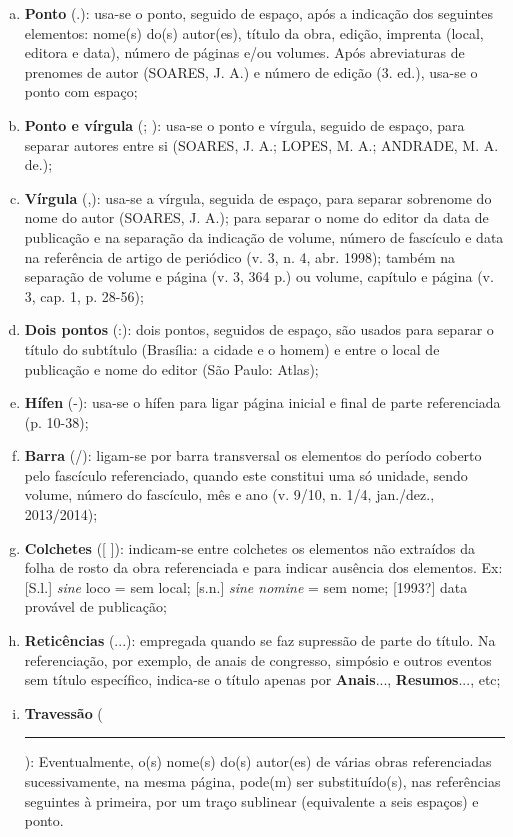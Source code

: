 \begin{enumerate}[a)]
  \item	 \textbf{Ponto} (.): usa-se o ponto, seguido de espaço, após a indicação dos seguintes elementos: nome(s) do(s) autor(es), título da obra, edição, imprenta (local, editora e data), número de páginas e/ou  volumes. Após abreviaturas de prenomes de autor (SOARES, J. A.) e número de edição (3. ed.), usa-se o ponto com espaço;
  \item	 \textbf{Ponto e vírgula} (; ): usa-se o ponto e vírgula, seguido de espaço, para separar autores entre si (SOARES, J. A.; LOPES, M. A.; ANDRADE, M. A. de.);
  \item	 \textbf{Vírgula} (,): usa-se a vírgula, seguida de espaço, para separar sobrenome do nome do autor (SOARES, J. A.); para separar o nome do editor da data de publicação e na separação da indicação de volume, número de fascículo e data na referência de artigo de periódico (v. 3, n. 4, abr. 1998); também na separação de volume e página (v. 3, 364 p.) ou volume, capítulo e página (v. 3, cap. 1, p. 28-56);
  \item	 \textbf{Dois pontos} (:): dois pontos, seguidos de espaço, são usados para separar o título do subtítulo (Brasília: a cidade e o homem) e entre o local de publicação e nome do editor (São Paulo: Atlas);
  \item	 \textbf{Hífen} (-): usa-se o hífen para ligar página inicial e final de parte referenciada (p. 10-38); 
  \item	 \textbf{Barra} (/): ligam-se por barra transversal os elementos do período coberto pelo fascículo referenciado, quando este constitui uma só unidade, sendo volume, número do fascículo, mês e ano (v. 9/10, n. 1/4, jan./dez., 2013/2014); 
  \item	 \textbf{Colchetes} ([ ]):  indicam-se entre colchetes os elementos não extraídos da folha de rosto da obra referenciada e para indicar ausência  dos elementos. Ex: [S.l.] \textit{sine} loco = sem local; [s.n.] \textit{sine nomine} = sem nome; [1993?] data provável de publicação;
  \item	 \textbf{Reticências} (...): empregada quando se faz supressão de parte do título. Na referenciação, por exemplo, de anais de congresso, simpósio e outros eventos sem título específico, indica-se o título apenas por \textbf{Anais}..., \textbf{Resumos}..., etc;
  \item	 \textbf{Travessão} (\rule{1cm}{0.4pt}): Eventualmente, o(s) nome(s) do(s) autor(es) de várias obras referenciadas sucessivamente, na mesma página, pode(m) ser substituído(s), nas referências seguintes à primeira, por um traço sublinear (equivalente a seis espaços) e ponto.
\end{enumerate}

